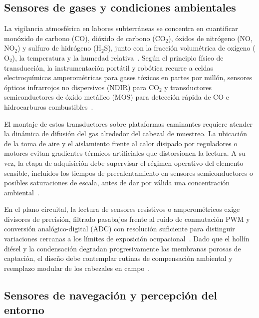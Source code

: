 \subsection{Sensores de gases y condiciones ambientales}

La vigilancia atmosférica en labores subterráneas se concentra en cuantificar monóxido de carbono ($\text{CO}$), dióxido de carbono ($\text{CO}_2$), óxidos de nitrógeno ($\text{NO}$, $\text{NO}_2$) y sulfuro de hidrógeno ($\text{H}_2\text{S}$), junto con la fracción volumétrica de oxígeno ($\text{O}_2$), la temperatura y la humedad relativa~\cite{MINEM_DS024_2016, OSINERGMIN_BoletinGSM_Ventilacion_2020, EU_ExposureDirective_2020}. Según el principio físico de transducción, la instrumentación portátil y robótica recurre a celdas electroquímicas amperométricas para gases tóxicos en partes por millón, sensores ópticos infrarrojos no dispersivos (NDIR) para $\text{CO}_2$ y transductores semiconductores de óxido metálico (MOS) para detección rápida de $\text{CO}$ e hidrocarburos combustibles~\cite{Cepa2023_sensors, CruzUlloa2024_Nose}.

El montaje de estos transductores sobre plataformas caminantes requiere atender la dinámica de difusión del gas alrededor del cabezal de muestreo. La ubicación de la toma de aire y el aislamiento frente al calor disipado por reguladores o motores evitan gradientes térmicos artificiales que distorsionen la lectura. A su vez, la etapa de adquisición debe supervisar el régimen operativo del elemento sensible, incluidos los tiempos de precalentamiento en sensores semiconductores o posibles saturaciones de escala, antes de dar por válida una concentración ambiental~\cite{Cepa2023_sensors, Deveau2015_OEL}.

En el plano circuital, la lectura de sensores resistivos o amperométricos exige divisores de precisión, filtrado pasabajos frente al ruido de conmutación PWM y conversión analógico-digital (ADC) con resolución suficiente para distinguir variaciones cercanas a los límites de exposición ocupacional~\cite{EU_ExposureDirective_2020}. Dado que el hollín diésel y la condensación degradan progresivamente las membranas porosas de captación, el diseño debe contemplar rutinas de compensación ambiental y reemplazo modular de los cabezales en campo~\cite{TorresSalazar2021_Diesel, Cortez2016_GEI_Minas}.

\subsection{Sensores de navegación y percepción del entorno}

